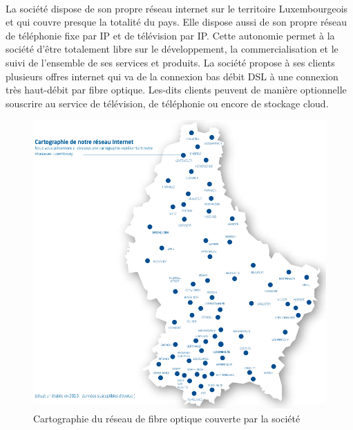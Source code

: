 \paragraph*{}
La société dispose de son propre réseau internet sur le territoire Luxembourgeois et qui couvre presque la totalité du pays. Elle dispose aussi de son propre réseau de téléphonie fixe par \gls{IP} et de télévision par \gls{IP}. Cette autonomie permet à la société  d'être totalement libre sur le développement, la commercialisation et le suivi de l'ensemble de ses services et produits. La société propose à ses clients plusieurs offres internet qui va de la connexion bas débit \gls{DSL} à une connexion très haut-débit par fibre optique. Les-dits clients peuvent de manière optionnelle souscrire au service de télévision, de téléphonie ou encore de stockage cloud.

\begin{figure}[H]
	\centering
	\includegraphics[scale=0.3]{assets/images/cartographie}
	\caption{Cartographie du réseau de fibre optique couverte par la société}
	\label{fig.2}
\end{figure}

\paragraph*{}

